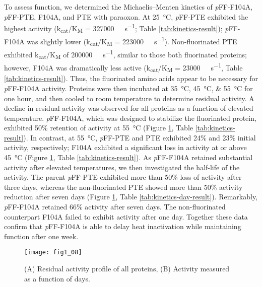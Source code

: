 \begin{refsection}
To assess function, we determined the Michaelis–Menten kinetics of
\emph{p}FF-F104A, \emph{p}FF-PTE, F104A, and PTE with paraoxon. At
\SI{25}{\celsius}, \emph{p}FF-PTE exhibited the highest activity
(k\textsubscript{cat}/K\textsubscript{M} = \SI{327000}{\per\Molar\per\second};
Table \ref{tab:kinetics-result}); \emph{p}FF-F104A was slightly lower
(k\textsubscript{cat}/K\textsubscript{M} = \SI{223000}{\per\Molar\per\second}).
Non-fluorinated PTE exhibited k\textsubscript{cat}/K\textsubscript{M} of
\SI{200000}{\per\Molar\per\second}, similar to those both fluorinated proteins;
however, F104A was dramatically less active
(k\textsubscript{cat}/K\textsubscript{M} = \SI{23000}{\per\Molar\per\second},
Table \ref{tab:kinetics-result}).  Thus, the fluorinated amino acids appear to
be necessary for \emph{p}FF-F104A activity.  Proteins were then incubated at
\SIlist{35;45;55}{\celsius} for one hour, and then cooled to room temperature
to determine residual activity. A decline in residual activity was observed for
all proteins as a function of elevated temperature. \emph{p}FF-F104A, which was
designed to stabilize the fluorinated protein, exhibited 50\% retention of
activity at \SI{55}{\celsius} (Figure \ref{fig:kinetics-fig}, Table
\ref{tab:kinetics-result}). In contrast, at \SI{55}{\celsius}, \emph{p}FF-PTE
and PTE exhibited 24\% and 23\% initial activity, respectively; F104A exhibited
a significant loss in activity at or above \SI{45}{\celsius} (Figure
\ref{fig:kinetics-fig}, Table \ref{tab:kinetics-result}). As \emph{p}FF-F104A
retained substantial activity after elevated temperatures, we then investigated
the half-life of the activity. The parent \emph{p}FF-PTE exhibited more than
50\% loss of activity after three days, whereas the non-fluorinated PTE showed
more than 50\% activity reduction after seven days (Figure
\ref{fig:kinetics-fig}, Table \ref{tab:kinetics-day-result}).  Remarkably,
\emph{p}FF-F104A retained 66\% activity after seven days. The non-fluorinated
counterpart F104A failed to exhibit activity after one day.  Together these
data confirm that \emph{p}FF-F104A is able to delay heat inactivation while
maintaining function after one week.

\begin{figure}[h!] \centering \texttt{[image: fig1\_08]}
    \caption[(A) Residual activity profile of all proteins, (B) Activity
    measured as a function of days.]{(A) Residual activity profile of all
    proteins, (B) Activity measured as a function of days.} 
    \label{fig:kinetics-fig} 
\end{figure}


\end{refsection}
